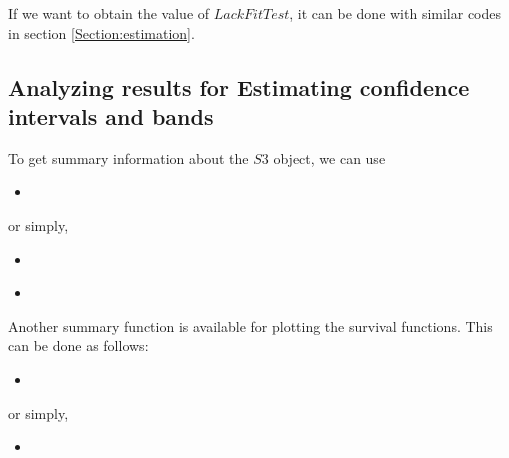\documentclass[12pt]{article}
\newcommand{\insertcode}[2]{\begin{itemize}\item[]\end{itemize}} %
\begin{document}
If we want to obtain the value of $LackFitTest$, it can be done with similar codes in section \ref{Section:estimation}.

\subsection{Analyzing results for Estimating confidence intervals and bands}
To get summary information about the $S3$ object, we can use

\insertcode{"Scripts/code23.pl"}{}
or simply,
\insertcode{"Scripts/code23s.pl"}{Summarizing performance of the two lack-of-fit tests.}
\insertcode{"Scripts/result23.pl"}{Results of scripts.}

Another summary function is available for plotting the survival functions. This can be done as follows:
\insertcode{"Scripts/code24.pl"}{}
or simply,
\insertcode{"Scripts/code24s.pl"}{Plotting estimates' process of the two lack-of-fit tests.}
\end{document}

